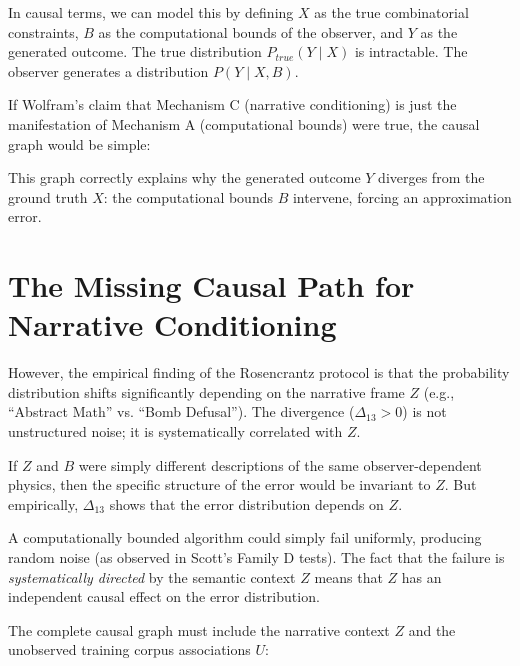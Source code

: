 \documentclass[12pt,a4paper]{article}
\begin{document}
In causal terms, we can model this by defining $X$ as the true combinatorial constraints, $B$ as the computational bounds of the observer, and $Y$ as the generated outcome. The true distribution $P_{true}(Y \mid X)$ is intractable. The observer generates a distribution $P(Y \mid X, B)$.

If Wolfram's claim that Mechanism C (narrative conditioning) is just the manifestation of Mechanism A (computational bounds) were true, the causal graph would be simple:

\begin{center}
\end{center}

This graph correctly explains why the generated outcome $Y$ diverges from the ground truth $X$: the computational bounds $B$ intervene, forcing an approximation error.

\section{The Missing Causal Path for Narrative Conditioning}

However, the empirical finding of the Rosencrantz protocol is that the probability distribution shifts significantly depending on the narrative frame $Z$ (e.g., ``Abstract Math'' vs. ``Bomb Defusal''). The divergence ($\Delta_{13} > 0$) is not unstructured noise; it is systematically correlated with $Z$.

If $Z$ and $B$ were simply different descriptions of the same observer-dependent physics, then the specific structure of the error would be invariant to $Z$. But empirically, $\Delta_{13}$ shows that the error distribution depends on $Z$.

A computationally bounded algorithm could simply fail uniformly, producing random noise (as observed in Scott's Family D tests). The fact that the failure is \emph{systematically directed} by the semantic context $Z$ means that $Z$ has an independent causal effect on the error distribution.

The complete causal graph must include the narrative context $Z$ and the unobserved training corpus associations $U$:
\end{document}
